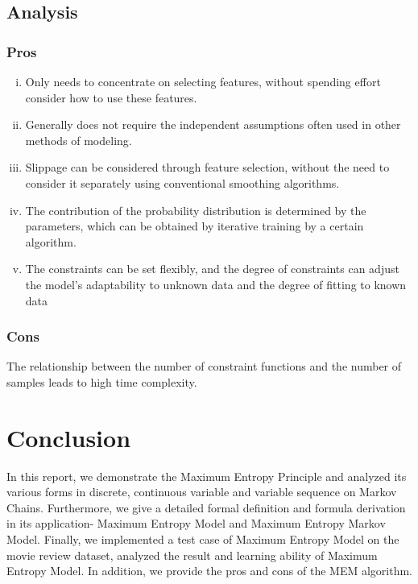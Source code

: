 \documentclass[12pt, a4paper]{article}
\begin{document}
\subsection{Analysis}

\subsubsection{Pros}
\begin{enumerate}[(i)]
	\item Only needs to concentrate on selecting features, without spending effort consider how to use these features.  
	\item Generally does not require the independent assumptions often used in other methods of modeling.
	\item Slippage can be considered through feature selection, without the need to consider it separately using conventional smoothing algorithms.
	\item The contribution of the probability distribution is determined by the parameters, which can be obtained by iterative training by a certain algorithm.
	\item The constraints can be set flexibly, and the degree of constraints can adjust the model's adaptability to unknown data and the degree of fitting to known data
	\end{enumerate} 
\subsubsection{Cons}
The relationship between the number of constraint functions and the number of samples leads to high time complexity.


\section{Conclusion}
In this report, we demonstrate the Maximum Entropy Principle and analyzed its various forms in discrete, continuous variable and variable sequence on Markov Chains. Furthermore, we give a detailed formal definition and formula derivation in its application- Maximum Entropy Model and Maximum Entropy Markov Model. Finally, we implemented a test case of Maximum Entropy Model on the movie review dataset, analyzed the result and learning ability of Maximum Entropy Model. In addition, we provide the pros and cons of the MEM algorithm. 


\newpage


\end{document}
